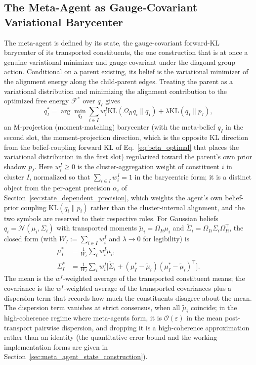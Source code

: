 \documentclass[11pt]{article}
\begin{document}
\subsection{The Meta-Agent as Gauge-Covariant Variational Barycenter}
\label{sec:meta_agent_definition}

The meta-agent is defined by its state, the gauge-covariant forward-KL barycenter of its transported constituents, the one construction that is at once a genuine variational minimizer and gauge-covariant under the diagonal group action. Conditional on a parent existing, its belief is the variational minimizer of the alignment energy along the child-parent edges. Treating the parent as a variational distribution and minimizing the alignment contribution to the optimized free energy $\mathcal{F}^*$ over $q_I$ gives
\begin{equation}
q_I^* = \arg\min_{q_I} \sum_{i \in I} w_i^I \mathrm{KL}(\Omega_{Ii} q_i \| q_I) + \lambda \mathrm{KL}(q_I \| p_I),
\label{eq:meta_agent_barycenter}
\end{equation}
an M-projection (moment-matching) barycenter (with the meta-belief $q_I$ in the second slot, the moment-projection direction, which is the opposite KL direction from the belief-coupling forward KL of Eq.~\eqref{eq:beta_optimal} that places the variational distribution in the first slot) regularized toward the parent's own prior shadow $p_I$. Here $w_i^I \ge 0$ is the cluster-aggregation weight of constituent $i$ in cluster $I$, normalized so that $\sum_{i \in I} w_i^I = 1$ in the barycentric form; it is a distinct object from the per-agent precision $\alpha_i$ of Section~\ref{sec:state_dependent_precision}, which weights the agent's own belief-prior coupling $\mathrm{KL}(q_i \| p_i)$ rather than the cluster-internal alignment, and the two symbols are reserved to their respective roles. For Gaussian beliefs $q_i = \mathcal{N}(\mu_i, \Sigma_i)$ with transported moments $\tilde{\mu}_i = \Omega_{Ii}\mu_i$ and $\tilde{\Sigma}_i = \Omega_{Ii}\Sigma_i\Omega_{Ii}^\top$, the closed form (with $W_I := \sum_{i \in I} w_i^I$ and $\lambda \to 0$ for legibility) is
\begin{align}
\mu_I^* &= \tfrac{1}{W_I}\textstyle\sum_i w_i^I \tilde{\mu}_i,
\label{eq:meta_agent_mu_barycenter}
\\
\Sigma_I^* &= \tfrac{1}{W_I}\textstyle\sum_i w_i^I\big[\tilde{\Sigma}_i + (\mu_I^* - \tilde{\mu}_i)(\mu_I^* - \tilde{\mu}_i)^\top\big].
\label{eq:meta_agent_sigma_barycenter}
\end{align}
The mean is the $w^I$-weighted average of the transported constituent means; the covariance is the $w^I$-weighted average of the transported covariances plus a dispersion term that records how much the constituents disagree about the mean. The dispersion term vanishes at strict consensus, when all $\tilde{\mu}_i$ coincide; in the high-coherence regime where meta-agents form, it is $\mathcal{O}(\varepsilon)$ in the mean post-transport pairwise dispersion, and dropping it is a high-coherence approximation rather than an identity (the quantitative error bound and the working implementation forms are given in Section~\ref{sec:meta_agent_state_construction}).
\end{document}
